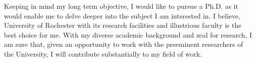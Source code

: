 \documentclass[12pt,a4paper,oneside]{amsart}
\begin{document}
Keeping in mind my long term objective, I would like to pursue a Ph.D. as it would enable me to delve deeper into the subject I am interested in. I believe, University of Rochester with its research facilities and illustrious faculty is the best choice for me. With my diverse academic background and zeal for research, I am sure that, given an opportunity to work with the preeminent researchers of the University, I will contribute substantially to my field of work.
\end{document}
